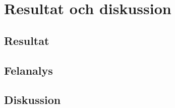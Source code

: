 \section{Resultat och diskussion}

\subsection{Resultat}

\subsection{Felanalys}

\subsection{Diskussion}